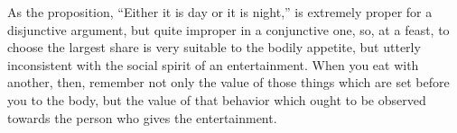 As the proposition,  ``Either it is day  or it is night,''  is extremely proper
for a disjunctive argument,  but quite improper in a conjunctive  one, so, at a
feast, to choose the largest share is very suitable to the bodily appetite, but
utterly inconsistent with  the social spirit of an entertainment.  When you eat
with another, then, remember  not only the value of those  things which are set
before  you to  the body,  but the  value of  that behavior  which ought  to be
observed towards the person who gives the entertainment.
